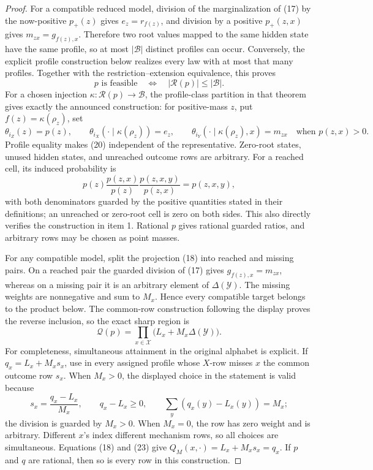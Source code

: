 \documentclass{article}
\begin{document}
\begin{proof}
For a compatible reduced model, division of the marginalization of (17)
by the now-positive \(p_+(z)\) gives \(e_z=r_{f(z)}\), and division by a
positive \(p_+(z,x)\) gives \(m_{zx}=g_{f(z),x}\).  Therefore two root
values mapped to the same hidden state have the same profile, so at most
\(|\mathcal B|\) distinct profiles can occur.  Conversely, the explicit
profile construction below realizes every law with at most that many
profiles.  Together with the restriction--extension equivalence, this
proves
\[
 p\text{ is feasible}
 \quad\Longleftrightarrow\quad
 |\mathcal R(p)|\leq|\mathcal B|.
\tag{19}
\]
For a chosen injection
\(\kappa:\mathcal R(p)\to\mathcal B\), the profile-class partition in
that theorem gives exactly the announced construction: for positive-mass
\(z\), put \(f(z)=\kappa(\rho_z)\), set
\[
 \theta_{i_Z}(z)=p(z),\qquad
 \theta_{i_X}(\cdot\mid\kappa(\rho_z))=e_z,
 \qquad
 \theta_{i_Y}(\cdot\mid\kappa(\rho_z),x)=m_{zx}
 \quad\text{when }p(z,x)>0.
\tag{20}
\]
Profile equality makes (20) independent of the representative.  Zero-root
states, unused hidden states, and unreached outcome rows are arbitrary.
For a reached cell, its induced probability is
\[
 p(z)\frac{p(z,x)}{p(z)}
       \frac{p(z,x,y)}{p(z,x)}=p(z,x,y),
\tag{21}
\]
with both denominators guarded by the positive quantities stated in their
definitions; an unreached or zero-root cell is zero on both sides.  This
also directly verifies the construction in item 1.  Rational \(p\) gives
rational guarded ratios, and arbitrary rows may be chosen as point masses.

For any compatible model, split the projection (18) into reached and
missing pairs.  On a reached pair the guarded division of (17) gives
\(g_{f(z),x}=m_{zx}\), whereas on a missing pair it is an arbitrary
element of \(\Delta(\mathcal Y)\).  The missing weights are nonnegative
and sum to \(M_x\).  Hence every compatible target belongs to the product
below.  The common-row construction following the display proves the
reverse inclusion, so the exact sharp region is
\[
 \mathcal Q(p)=
 \prod_{x\in\mathcal X}\bigl(L_x+M_x\Delta(\mathcal Y)\bigr).
\tag{22}
\]
For completeness, simultaneous attainment in the original alphabet is
explicit.  If \(q_x=L_x+M_xs_x\), use in every assigned profile whose
\(X\)-row misses \(x\) the common outcome row \(s_x\).  When \(M_x>0\),
the displayed choice in the statement is valid because
\[
 s_x=\frac{q_x-L_x}{M_x},\qquad
 q_x-L_x\geq0,\qquad
 \sum_y(q_x(y)-L_x(y))=M_x;
\tag{23}
\]
the division is guarded by \(M_x>0\).  When \(M_x=0\), the row has zero
weight and is arbitrary.  Different \(x\)'s index different mechanism
rows, so all choices are simultaneous.  Equations (18) and (23) give
\(Q_M(x,\cdot)=L_x+M_xs_x=q_x\).  If \(p\) and \(q\) are rational, then
so is every row in this construction.


\end{proof}
\end{document}
